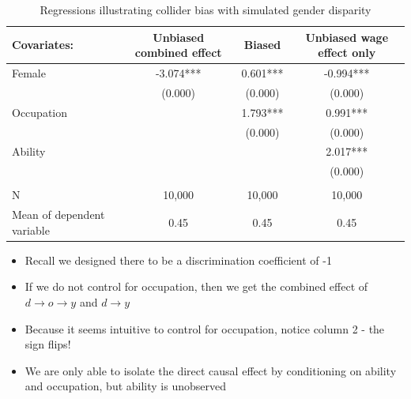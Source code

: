 \begin{frame}[plain, shrink=20]

  \begin{table}[htbp]\centering
    \scriptsize
    \caption{Regressions illustrating collider bias with simulated gender disparity}
    \begin{center}
      \begin{tabular}{l*{3}{c}}
        \toprule
        \multicolumn{1}{l}{Covariates: }&
        \multicolumn{1}{c}{\textbf{Unbiased combined effect}}&
        \multicolumn{1}{c}{\textbf{Biased }}&
        \multicolumn{1}{c}{\textbf{Unbiased wage effect only}}\\
        \midrule
        Female                     & -3.074*** & 0.601*** & -0.994*** \\
                                   & (0.000)   & (0.000)  & (0.000)   \\
        Occupation                 &           & 1.793*** & 0.991***  \\
                                   &           & (0.000)  & (0.000)   \\
        Ability                    &           &          & 2.017***  \\
                                   &           &          & (0.000)   \\
        \\
        \midrule
        N                          & 10,000    & 10,000   & 10,000    \\
        Mean of dependent variable & 0.45      & 0.45     & 0.45      \\
        \bottomrule
      \end{tabular}
    \end{center}
  \end{table}

  \begin{itemize}
    \item Recall we designed there to be a discrimination coefficient of -1
    \item If we do not control for occupation, then we get the combined effect of $d \rightarrow o \rightarrow y$ and $d  \rightarrow y$
    \item Because it seems intuitive to control for occupation, notice column 2 - the sign flips!
    \item We are only able to isolate the direct causal effect by conditioning on ability and occupation, but ability is unobserved
  \end{itemize}

\end{frame}

